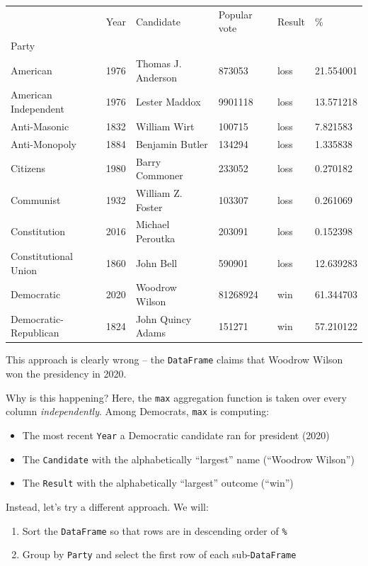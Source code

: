 \documentclass[
  letterpaper,
  DIV=11,
  numbers=noendperiod]{scrreprt}
\providecommand{\tightlist}{%
  \setlength{\itemsep}{0pt}\setlength{\parskip}{0pt}}\usepackage{longtable,booktabs,array}
\begin{document}
\begin{longtable}[]{@{}llllll@{}}
\toprule\noalign{}
& Year & Candidate & Popular vote & Result & \% \\
Party & & & & & \\
\midrule\noalign{}
\endhead
\bottomrule\noalign{}
\endlastfoot
American & 1976 & Thomas J. Anderson & 873053 & loss & 21.554001 \\
American Independent & 1976 & Lester Maddox & 9901118 & loss &
13.571218 \\
Anti-Masonic & 1832 & William Wirt & 100715 & loss & 7.821583 \\
Anti-Monopoly & 1884 & Benjamin Butler & 134294 & loss & 1.335838 \\
Citizens & 1980 & Barry Commoner & 233052 & loss & 0.270182 \\
Communist & 1932 & William Z. Foster & 103307 & loss & 0.261069 \\
Constitution & 2016 & Michael Peroutka & 203091 & loss & 0.152398 \\
Constitutional Union & 1860 & John Bell & 590901 & loss & 12.639283 \\
Democratic & 2020 & Woodrow Wilson & 81268924 & win & 61.344703 \\
Democratic-Republican & 1824 & John Quincy Adams & 151271 & win &
57.210122 \\
\end{longtable}

This approach is clearly wrong -- the \texttt{DataFrame} claims that
Woodrow Wilson won the presidency in 2020.

Why is this happening? Here, the \texttt{max} aggregation function is
taken over every column \emph{independently}. Among Democrats,
\texttt{max} is computing:

\begin{itemize}
\tightlist
\item
  The most recent \texttt{Year} a Democratic candidate ran for president
  (2020)
\item
  The \texttt{Candidate} with the alphabetically ``largest'' name
  (``Woodrow Wilson'')
\item
  The \texttt{Result} with the alphabetically ``largest'' outcome
  (``win'')
\end{itemize}

Instead, let's try a different approach. We will:

\begin{enumerate}
\def\labelenumi{\arabic{enumi}.}
\tightlist
\item
  Sort the \texttt{DataFrame} so that rows are in descending order of
  \texttt{\%}
\item
  Group by \texttt{Party} and select the first row of each
  sub-\texttt{DataFrame}
\end{enumerate}
\end{document}
